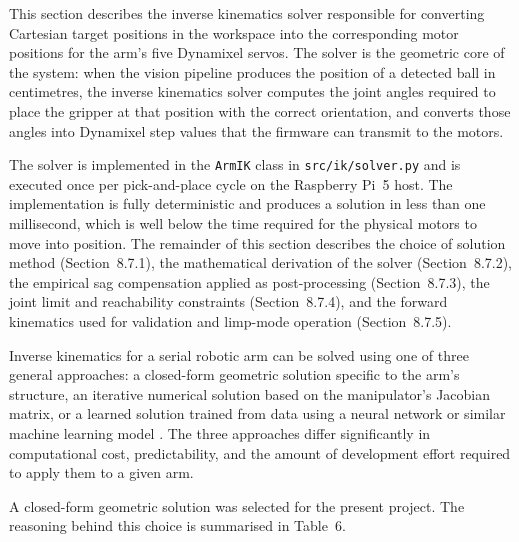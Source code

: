 
This section describes the inverse kinematics solver responsible for 
converting Cartesian target positions in the workspace into the 
corresponding motor positions for the arm's five Dynamixel servos. 
The solver is the geometric core of the system: when the vision 
pipeline produces the position of a detected ball in centimetres, 
the inverse kinematics solver computes the joint angles required to 
place the gripper at that position with the correct orientation, 
and converts those angles into Dynamixel step values that the 
firmware can transmit to the motors.

The solver is implemented in the \texttt{ArmIK} class in 
\texttt{src/ik/solver.py} and is executed once per pick-and-place 
cycle on the Raspberry Pi~5 host. The implementation is fully 
deterministic and produces a solution in less than one millisecond, 
which is well below the time required for the physical motors to 
move into position. The remainder of this section describes the 
choice of solution method (Section~8.7.1), the mathematical 
derivation of the solver (Section~8.7.2), the empirical sag 
compensation applied as post-processing (Section~8.7.3), the 
joint limit and reachability constraints (Section~8.7.4), and 
the forward kinematics used for validation and limp-mode 
operation (Section~8.7.5).


Inverse kinematics for a serial robotic arm can be solved using one 
of three general approaches: a closed-form geometric solution 
specific to the arm's structure, an iterative numerical solution 
based on the manipulator's Jacobian matrix, or a learned solution 
trained from data using a neural network or similar machine 
learning model \cite{craig2005}. The three approaches differ 
significantly in computational cost, predictability, and the 
amount of development effort required to apply them to a given arm.

A closed-form geometric solution was selected for the present 
project. The reasoning behind this choice is summarised in 
Table~6.

